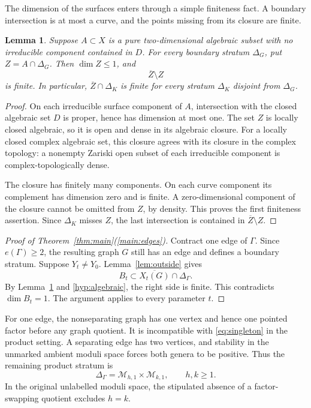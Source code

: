 \documentclass[11pt]{article}
\newcommand{\M}{\mathcal M}
\newcommand{\cl}[1]{\overline{#1}}
\newtheorem{lemma}[theorem]{Lemma}
\theoremstyle{definition}
\theoremstyle{remark}
\begin{document}
The dimension of the surfaces enters through a simple finiteness fact. A boundary intersection is at most a curve, and the points missing from its closure are finite.

\begin{lemma}\label{lem:frontier}
Suppose $A\subset X$ is a pure two-dimensional algebraic subset with no irreducible component contained in $D$. For every boundary stratum $\Delta_G$, put $Z=A\cap\Delta_G$. Then $\dim Z\leq1$, and
\[
 \cl Z\setminus Z
\]
is finite. In particular, $\cl Z\cap\Delta_K$ is finite for every stratum $\Delta_K$ disjoint from $\Delta_G$.
\end{lemma}

\begin{proof}
On each irreducible surface component of $A$, intersection with the closed algebraic set $D$ is proper, hence has dimension at most one. The set $Z$ is locally closed algebraic, so it is open and dense in its algebraic closure. For a locally closed complex algebraic set, this closure agrees with its closure in the complex topology: a nonempty Zariski open subset of each irreducible component is complex-topologically dense.

The closure has finitely many components. On each curve component its complement has dimension zero and is finite. A zero-dimensional component of the closure cannot be omitted from $Z$, by density. This proves the first finiteness assertion. Since $\Delta_K$ misses $Z$, the last intersection is contained in $\cl Z\setminus Z$.
\end{proof}

\begin{proof}[Proof of Theorem~\ref{thm:main}(\ref{main:edges})]
Contract one edge of $\Gamma$. Since $e(\Gamma)\geq2$, the resulting graph $G$ still has an edge and defines a boundary stratum. Suppose $Y_t\ne Y_0$. Lemma~\ref{lem:outside} gives
\[
 B_t\subset\cl{X_t(G)}\cap\Delta_\Gamma.
\]
By Lemma~\ref{lem:frontier} and \eqref{hyp:algebraic}, the right side is finite. This contradicts $\dim B_t=1$. The argument applies to every parameter $t$.
\end{proof}

For one edge, the nonseparating graph has one vertex and hence one pointed factor before any graph quotient. It is incompatible with \eqref{eq:singleton} in the product setting. A separating edge has two vertices, and stability in the unmarked ambient moduli space forces both genera to be positive. Thus the remaining product stratum is
\begin{equation}\label{eq:separating}
 \Delta_\Gamma=\M_{h,1}\times\M_{k,1},\qquad h,k\geq1.
\end{equation}
In the original unlabelled moduli space, the stipulated absence of a factor-swapping quotient excludes $h=k$.
\end{document}
